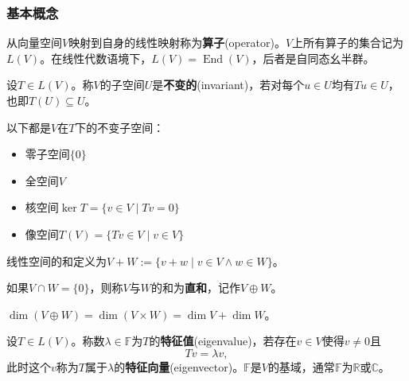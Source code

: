 \subsubsection{基本概念}
\begin{definition}[算子]
    从向量空间$V$映射到自身的线性映射称为\textbf{算子}(operator)。$V$上所有算子的集合记为$L(V)$。在线性代数语境下，$L(V) = \operatorname{End}(V)$，后者是自同态幺半群。
\end{definition}

\begin{definition}[不变子空间]
    设$T \in L(V)$。称$V$的子空间$U$是\textbf{不变的}(invariant)，若对每个$u \in U$均有$Tu \in U$，也即$T(U) \subseteq U$。
\end{definition}

\begin{example}
    以下都是$V$在$T$下的不变子空间：
    \begin{itemize}
        \item 零子空间$\{0\}$
        \item 全空间$V$
        \item 核空间$\ker T = \{v \in V \mid Tv = 0\}$
        \item 像空间$T(V) = \{Tv \in V \mid v \in V\}$
    \end{itemize}
\end{example}

\begin{definition}[直和]
    线性空间的和定义为$V + W := \{v + w \mid v \in V \land w \in W\}$。

    如果$V \cap W = \{0\}$，则称$V$与$W$的和为\textbf{直和}，记作$V \oplus W$。
\end{definition}

\begin{theorem}
    $\dim(V \oplus W) = \dim(V \times W) = \dim V + \dim W$。
\end{theorem}

\begin{definition}
    设$T \in L(V)$。称数$\lambda \in \mathbb{F}$为$T$的\textbf{特征值}(eigenvalue)，若存在$v \in V$使得$v \neq 0$且
    \begin{equation}
        Tv = \lambda v,
    \end{equation}
    此时这个$v$称为$T$属于$\lambda$的\textbf{特征向量}(eigenvector)。$\mathbb{F}$是$V$的基域，通常$\mathbb{F}$为$\mathbb{R}$或$\mathbb{C}$。
\end{definition}

